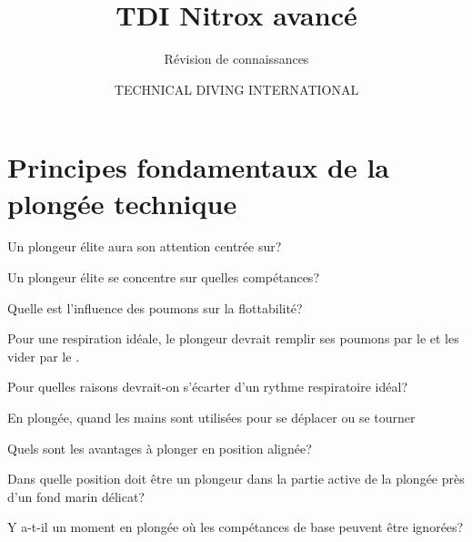 \documentclass[english,12pt,a4paper]{article}
\title{TDI Nitrox avancé}
\subtitle{Révision de connaissances}
\author{TECHNICAL DIVING INTERNATIONAL}
\begin{document}
	

	\setcounter{section}{1}
	\section{Principes fondamentaux de la plongée technique}

	\begin{outline}
		\1 Un plongeur élite aura son attention centrée sur?
			\2 \hspace{-2em}\hrulefill
			\2 \hspace{-2em}\hrulefill
	
		\1 Un plongeur élite se concentre sur quelles compétances?
			\2 \hspace{-2em}\hrulefill
			\2 \hspace{-2em}\hrulefill
			\2 \hspace{-2em}\hrulefill
	
		\1 Quelle est l'influence des poumons sur la flottabilité?
			\2 \hspace{-2em}\hrulefill
			\2 \hspace{-2em}\hrulefill
			\2 \hspace{-2em}\hrulefill
	
		\1 Pour une respiration idéale, le plongeur devrait remplir ses poumons par le \underline{\hspace{1.5cm}} et les vider par le \underline{\hspace{1.5cm}}.
	
		\1 Pour quelles raisons devrait-on s'écarter d'un rythme respiratoire idéal?
			\2 \hspace{-2em}\hrulefill
			\2 \hspace{-2em}\hrulefill
	
		\1 En plongée, quand les mains sont utilisées pour se déplacer ou se tourner
			\2 \hspace{-2em}\hrulefill
			\2 \hspace{-2em}\hrulefill
	
		\1 Quels sont les avantages à plonger en position alignée?
			\2 \hspace{-2em}\hrulefill
			\2 \hspace{-2em}\hrulefill
			\2 \hspace{-2em}\hrulefill
	
		\1 Dans quelle position doit être un plongeur dans la partie active de la plongée près 	d'un fond marin délicat?
			\2 \hspace{-2em}\hrulefill
			\2 \hspace{-2em}\hrulefill

		\1 Y a-t-il un moment en plongée où les compétances de base peuvent être ignorées?
			\2 \hspace{-2em}\hrulefill
			\2 \hspace{-2em}\hrulefill
	\end{outline}
	\pagebreak
\end{document}
